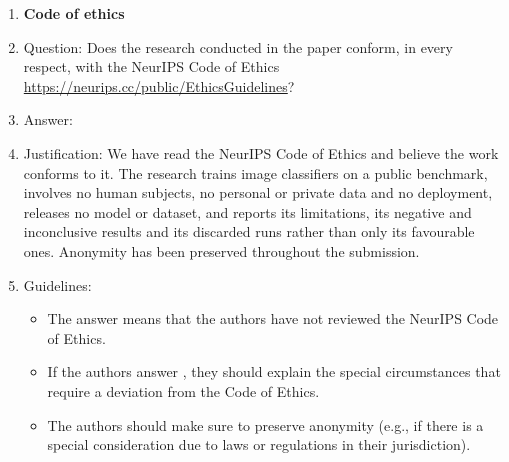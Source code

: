 \begin{enumerate}
\item {\bf Code of ethics}
    \item[] Question: Does the research conducted in the paper conform, in every respect, with the NeurIPS Code of Ethics \url{https://neurips.cc/public/EthicsGuidelines}?
    \item[] Answer: \answerYes{}
    \item[] Justification: We have read the NeurIPS Code of Ethics and believe the work conforms to it. The research trains image classifiers on a public benchmark, involves no human subjects, no personal or private data and no deployment, releases no model or dataset, and reports its limitations, its negative and inconclusive results and its discarded runs rather than only its favourable ones. Anonymity has been preserved throughout the submission.
    \item[] Guidelines:
    \begin{itemize}
        \item The answer \answerNA{} means that the authors have not reviewed the NeurIPS Code of Ethics.
        \item If the authors answer \answerNo, they should explain the special circumstances that require a deviation from the Code of Ethics.
        \item The authors should make sure to preserve anonymity (e.g., if there is a special consideration due to laws or regulations in their jurisdiction).
    \end{itemize}



\end{enumerate}
